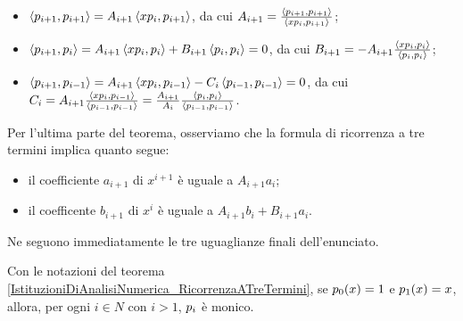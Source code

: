 \begin{itemize}
		\item $\left \langle p_{i + 1} , p_{i + 1} \right \rangle = A_{i + 1} \left \langle x p_i , p_{i +1} \right \rangle$, da cui $A_{i + 1} = \frac{\left \langle p_{i + 1} , p_{i + 1} \right \rangle}{\left \langle xp_i , p_{i + 1} \right \rangle}$;
		\item $\left \langle p_{i + 1} , p_i \right \rangle = A_{i + 1}\left \langle xp_i , p_i \right \rangle + B_{i + 1}\left \langle p_i , p_i \right \rangle = 0$, da cui $B_{i + 1} = - A_{i + 1} \frac{\left \langle xp_i , p_i \right \rangle}{\left \langle p_i , p_i \right \rangle}$;
		\item $\left \langle p_{i + 1} , p_{i - 1} \right \rangle = A_{i + 1}\left \langle xp_i , p_{i - 1} \right \rangle - C_i\left \langle p_{i - 1} , p_{i - 1} \right \rangle = 0$, da cui $C_i = A_{i + 1} \frac{\left \langle xp_i , p_{i - 1} \right \rangle}{\left \langle p_{i - 1} , p_{i - 1} \right \rangle} = \frac{A_{i + 1}}{A_i} \frac{\left \langle p_i , p_i \right \rangle}{\left \langle p_{i - 1} , p_{i - 1} \right \rangle}$.
\end{itemize}
\par Per l'ultima parte del teorema, osserviamo che la formula di ricorrenza a tre termini implica quanto segue:
\begin{itemize}
	\item il coefficiente $a_{i + 1}$ di $x^{i + 1}$ \`e uguale a $A_{i + 1}a_i$;
	\item il coefficente $b_{i + 1}$ di $x^i$ \`e uguale a $A_{i + 1} b_i + B_{i + 1}a_i$.
\end{itemize}
\par Ne seguono immediatamente le tre uguaglianze finali dell'enunciato. \EndProof
\begin{Corollary}
	Con le notazioni del teorema \ref{IstituzioniDiAnalisiNumerica_RicorrenzaATreTermini},
	se $p_0(x) = 1$ e $p_1(x) = x$, allora, per ogni $i \in N$ con $i > 1$, $p_i$ \`e monico.
\end{Corollary}
